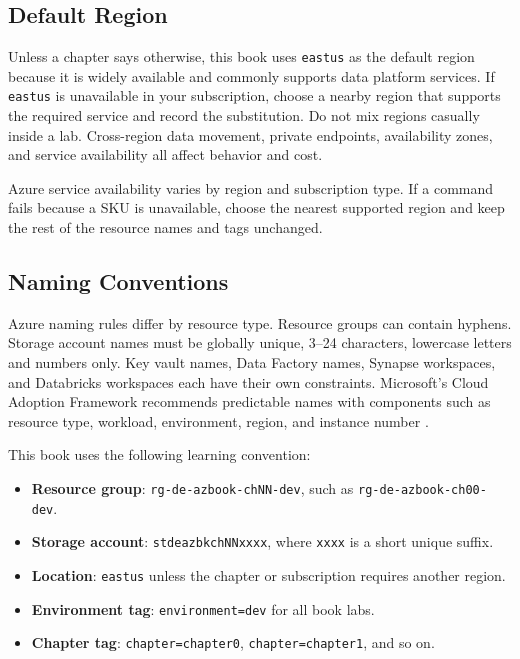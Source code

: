 \subsection{Default Region}
Unless a chapter says otherwise, this book uses \texttt{eastus} as the default region because it is widely available and commonly supports data platform services. If \texttt{eastus} is unavailable in your subscription, choose a nearby region that supports the required service and record the substitution. Do not mix regions casually inside a lab. Cross-region data movement, private endpoints, availability zones, and service availability all affect behavior and cost.

\begin{notebox}
Azure service availability varies by region and subscription type. If a command fails because a SKU is unavailable, choose the nearest supported region and keep the rest of the resource names and tags unchanged.
\end{notebox}

\subsection{Naming Conventions}
Azure naming rules differ by resource type. Resource groups can contain hyphens. Storage account names must be globally unique, 3--24 characters, lowercase letters and numbers only. Key vault names, Data Factory names, Synapse workspaces, and Databricks workspaces each have their own constraints. Microsoft's Cloud Adoption Framework recommends predictable names with components such as resource type, workload, environment, region, and instance number \cite{microsoft2025naming}.

This book uses the following learning convention:

\begin{itemize}
    \item \textbf{Resource group}: \texttt{rg-de-azbook-chNN-dev}, such as \texttt{rg-de-azbook-ch00-dev}.
    \item \textbf{Storage account}: \texttt{stdeazbkchNNxxxx}, where \texttt{xxxx} is a short unique suffix.
    \item \textbf{Location}: \texttt{eastus} unless the chapter or subscription requires another region.
    \item \textbf{Environment tag}: \texttt{environment=dev} for all book labs.
    \item \textbf{Chapter tag}: \texttt{chapter=chapter0}, \texttt{chapter=chapter1}, and so on.
\end{itemize}


